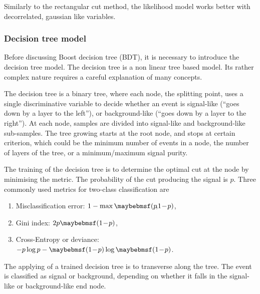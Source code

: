 
Similarly to the rectangular cut method, the likelihood model works better with decorrelated, gaussian like variables.



\subsubsection{Decision tree model}
\label{sec:pandoraDecisionTree}

Before discussing Boost decision tree (BDT), it is necessary to introduce the decision tree model. The decision tree is a non linear tree based model. Its rather complex nature requires a careful explanation of many concepts.

The decision tree is a binary tree, where each node, the splitting point, uses a single discriminative variable to decide whether an event is signal-like (``goes down by a layer to the left''), or background-like (``goes down by a layer to the right''). At each node, samples are divided into signal-like and background-like sub-samples. The tree growing starts at the root node, and stops at certain criterion, which could be the minimum number of events in a node, the number of layers of the tree, or a minimum/maximum signal purity.

The training of the decision tree is to determine the optimal cut at the node by minimising the metric. The probability of the cut producing the signal is $p$. Three commonly used metrics for two-class classification are
\begin{enumerate}
\item Misclassification error:  $1 - \max\parenths{p\!,\!1\!-\!p}$,
\item Gini index: $2p\parenths{1\!-\!p}$,
\item Cross-Entropy or deviance: $-p\log{p}-\parenths{1\!-\!p}\log\parenths{1\!-\!p}$.
\end{enumerate}

The applying of a trained decision tree is to transverse along the tree. The event is classified as signal or background, depending on whether it falls in the signal-like or background-like end node.

